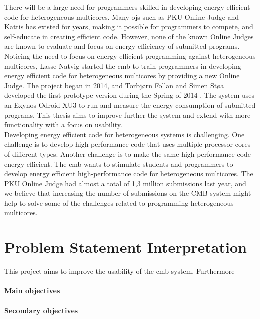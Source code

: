 There will be a large need for programmers skilled in developing energy efficient code for heterogeneous multicores. Many \gls{ojs} such as PKU Online Judge and Kattis has existed for years, making it possible for programmers to compete, and self-educate in creating efficient code. However, none of the known Online Judges are known to evaluate and focus on energy efficiency of submitted programs. Noticing the need to focus on energy efficient programming against heterogeneous multicores, Lasse Natvig started the \gls{cmb} to train programmers in developing energy efficient code for heterogeneous multicores by providing a new Online Judge. The project began in 2014, and Torbjørn Follan and Simen Støa developed the first prototype version during the Spring of 2014 \cite{mt:T&S}. The system uses an Exynos Odroid-XU3 \cite{m:XU3} to run and measure the energy consumption of submitted programs. This thesis aims to improve further the system and extend with more functionality with a focus on usability. \\

Developing energy efficient code for heterogeneous systems is challenging. One challenge is to develop high-performance code that uses multiple processor cores of different types. Another challenge is to make the same high-performance code energy efficient. The \gls{cmb} wants to stimulate students and programmers to develop energy efficient high-performance code for heterogeneous multicores. The PKU Online Judge had almost a total of 1,3 million submissions last year, and we believe that increasing the number of submissions on the CMB system might help to solve some of the challenges related to programming heterogeneous multicores. \\

\clearpage

\section{Problem Statement Interpretation}
\label{sec:rq}
This project aims to improve the usability of the \gls{cmb} system. Furthermore


\paragraph*{Main objectives} \hfill


\paragraph*{Secondary objectives} \hfill



